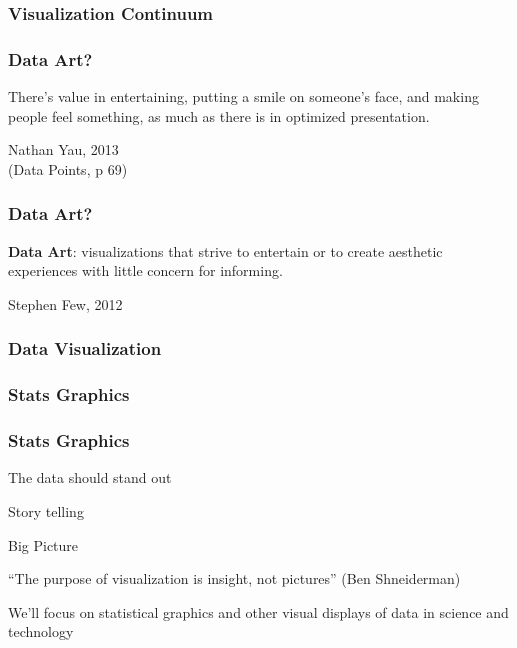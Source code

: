 \documentclass[12pt]{beamer}\usepackage[]{graphicx}\usepackage[]{color}
\begin{document}

\begin{frame}
\frametitle{Visualization Continuum}
\begin{center}
\end{center}
\end{frame}


\begin{frame}
\frametitle{Data Art?}

{\large There's value in entertaining, putting a smile on someone's face, and making people feel something, as much as there is in optimized presentation.}

\bigskip
{\footnotesize Nathan Yau, 2013\\
(Data Points, p 69)
}

\end{frame}


\begin{frame}
\frametitle{Data Art?}

{\large \textbf{Data Art}: visualizations that strive to entertain or to create aesthetic experiences with little concern for informing.}

\bigskip
{\footnotesize Stephen Few, 2012}

\end{frame}


\begin{frame}
\frametitle{Data Visualization}
\begin{center}
\end{center}
\end{frame}


\begin{frame}
\frametitle{Stats Graphics}
\begin{center}
\end{center}
\end{frame}


\begin{frame}
\frametitle{Stats Graphics}

\bi
  \item The data should stand out
  \item Story telling
  \item Big Picture
  \item ``The purpose of visualization is insight, not pictures'' (Ben Shneiderman)
\ei
\eb

{\footnotesize We'll focus on statistical graphics and other visual displays of data in science and technology}

\end{frame}
\end{document}

